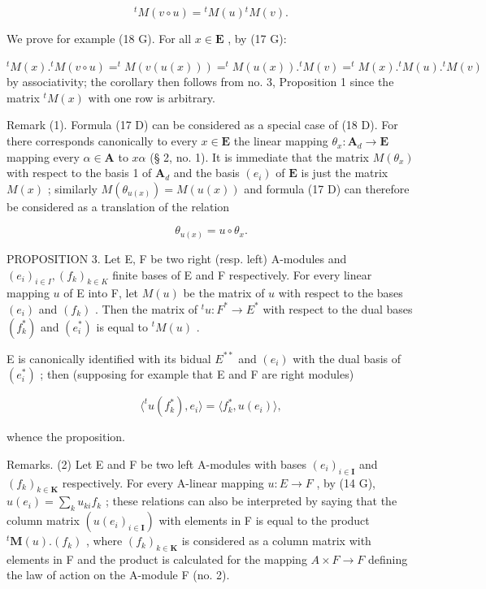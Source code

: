 \[
{ } ^ { t } M ( v \circ u ) = { } ^ { t } M ( u ) { } ^ { t } M ( v ) .\tag{18 G}
\]

We prove for example (18 G). For all \(x \in \mathbf{E}\) , by (17 G):

\(^{t}M(x).^{t}M(v\circ u)=^{t}M(v(u(x)))=^{t}M(u(x)).^{t}M(v)=^{t}M(x).^{t}M(u).^{t}M(v)\) by associativity; the corollary then follows from no. 3, Proposition 1 since the matrix \(^{t}M(x)\) with one row is arbitrary.

Remark (1). Formula (17 D) can be considered as a special case of (18 D). For there corresponds canonically to every \(x \in \mathbf{E}\) the linear mapping \(\theta_x: \mathbf{A}_d \to \mathbf{E}\) mapping every \(\alpha \in \mathbf{A}\) to \(x\alpha\) (§ 2, no. 1). It is immediate that the matrix \(M(\theta_x)\) with respect to the basis 1 of \(\mathbf{A}_d\) and the basis \((e_i)\) of \(\mathbf{E}\) is just the matrix \(M(x)\) ; similarly \(M(\theta_{u(x)}) = M(u(x))\) and formula (17 D) can therefore be considered as a translation of the relation

\[
\theta_ {u (x)} = u \circ \theta_ {x}.
\]

PROPOSITION 3. Let E, F be two right (resp. left) A-modules and \((e_i)_{i\in I}, (f_k)_{k\in K}\) finite bases of E and F respectively. For every linear mapping \(u\) of E into F, let \(M(u)\) be the matrix of \(u\) with respect to the bases \((e_i)\) and \((f_k)\) . Then the matrix of \(^t u: F^* \to E^*\) with respect to the dual bases \((f_k^*)\) and \((e_i^*)\) is equal to \(^t M(u)\) .

E is canonically identified with its bidual \(E^{**}\) and \((e_{i})\) with the dual basis of \((e_{i}^{*})\) ; then (supposing for example that E and F are right modules)

\[
\langle^ {t} u (f _ {k} ^ {*}), e _ {i} \rangle = \langle f _ {k} ^ {*}, u (e _ {i}) \rangle ,
\]

whence the proposition.

Remarks. (2) Let E and F be two left A-modules with bases \((e_{i})_{i\in\mathbf{I}}\) and \((f_{k})_{k\in\mathbf{K}}\) respectively. For every A-linear mapping \(u:E\to F\) , by (14 G), \(u(e_{i})=\sum_{k}u_{ki}f_{k}\) ; these relations can also be interpreted by saying that the column matrix \((u(e_{i})_{i\in\mathbf{I}})\) with elements in F is equal to the product \({}^{t}\mathbf{M}(u).(f_{k})\) , where \((f_{k})_{k\in\mathbf{K}}\) is considered as a column matrix with elements in F and the product is calculated for the mapping \(A\times F\to F\) defining the law of action on the A-module F (no. 2).

